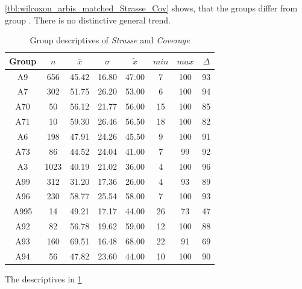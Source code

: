 \cref{tbl:wilcoxon_arbis_matched_Strasse_Cov} shows, that the groups  differ from group . There is no distinctive general trend.
\begin{table}[ht!]
	\tiny
	\centering
	\begin{tabular}{c|c|c|c|c|c|c|c}
		\toprule
		Group & $n$ & $\bar{x}$ & $\sigma$ & $\tilde{x}$ & $min$ & $max$ & $\Delta$ \\
		\midrule
		A9   & 656  & 45.42 & 16.80 & 47.00 & 7  & 100 & 93 \\ 
		A7   & 302  & 51.75 & 26.20 & 53.00 & 6  & 100 & 94 \\ 
		A70  & 50   & 56.12 & 21.77 & 56.00 & 15 & 100 & 85 \\ 
		A71  & 10   & 59.30 & 26.46 & 56.50 & 18 & 100 & 82 \\ 
		A6   & 198  & 47.91 & 24.26 & 45.50 & 9  & 100 & 91 \\ 
		A73  & 86   & 44.52 & 24.04 & 41.00 & 7  & 99  & 92 \\ 
		A3   & 1023 & 40.19 & 21.02 & 36.00 & 4  & 100 & 96 \\ 
		A99  & 312  & 31.20 & 17.36 & 26.00 & 4  & 93  & 89 \\ 
		A96  & 230  & 58.77 & 25.54 & 58.00 & 7  & 100 & 93 \\ 
		A995 & 14   & 49.21 & 17.17 & 44.00 & 26 & 73  & 47 \\ 
		A92  & 82   & 56.78 & 19.62 & 59.00 & 12 & 100 & 88 \\ 
		A93  & 160  & 69.51 & 16.48 & 68.00 & 22 & 91  & 69 \\ 
		A94  & 56   & 47.82 & 23.60 & 44.00 & 10 & 100 & 90 \\ 
		\bottomrule
	\end{tabular}
	\caption{Group descriptives of \textit{Strasse} and \textit{Coverage}}
	\label{tbl:descriptives_arbis_matched_Strasse_Cov}
\end{table}
The descriptives in \cref{tbl:descriptives_arbis_matched_Strasse_Cov}


